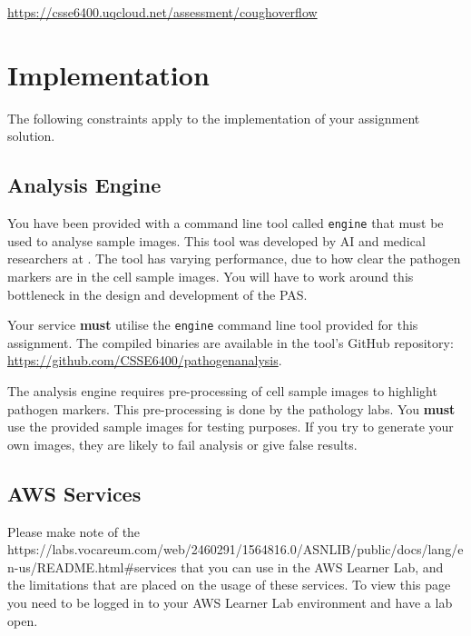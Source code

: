 \documentclass{csse4400}
\begin{document}
\url{https://csse6400.uqcloud.net/assessment/coughoverflow}


\section{Implementation}
The following constraints apply to the implementation of your assignment solution.

\subsection{Analysis Engine}

You have been provided with a command line tool called \texttt{engine} that must be used to analyse sample images.
This tool was developed by AI and medical researchers at
.
The tool has varying performance, due to how clear the pathogen markers are in the cell sample images.
You will have to work around this bottleneck in the design and development of the PAS.

Your service \textbf{must} utilise the \texttt{engine} command line tool provided for this assignment.
The compiled binaries are available in the tool's GitHub repository: \url{https://github.com/CSSE6400/pathogenanalysis}.


The analysis engine requires pre-processing of cell sample images to highlight pathogen markers.
This pre-processing is done by the pathology labs.
You \textbf{must} use the provided sample images for testing purposes.
If you try to generate your own images, they are likely to fail analysis or give false results.


\subsection{AWS Services}
Please make note of the 
{https://labs.vocareum.com/web/2460291/1564816.0/ASNLIB/public/docs/lang/en-us/README.html\#services}
that you can use in the AWS Learner Lab, and the limitations that are placed on the usage of these services.
To view this page you need to be logged in to your AWS Learner Lab environment and have a lab open.
\end{document}
